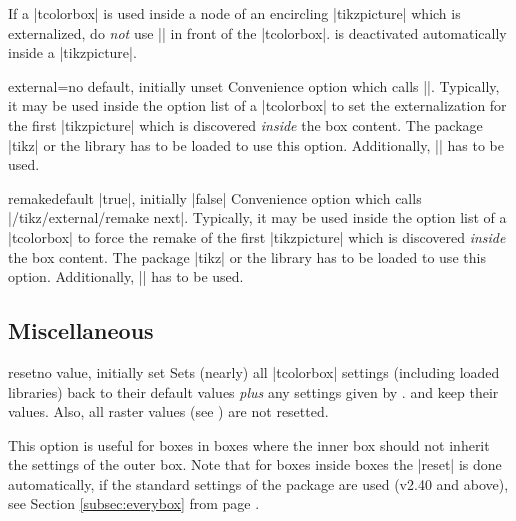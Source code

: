 \begin{marker}
If a |tcolorbox| is used inside a node of an encircling |tikzpicture| which is externalized,
do \emph{not} use |\tikzexternaldisable| in front of the |tcolorbox|.
 is deactivated automatically inside a |tikzpicture|.
\end{marker}

\begin{docTcbKey}{external}{=}{no default, initially unset}
  Convenience option which calls ||. Typically,
  it may be used inside the option list of a |tcolorbox| to set the
  externalization  for the first |tikzpicture| which is discovered
  \emph{inside} the box content.
  The package |tikz| \cite{tantau:2015a} or the library  has to be loaded to use this option.
  Additionally, |\usetikzlibrary{external}| has to be used.
\end{docTcbKey}

\begin{docTcbKey}{remake}{}{default |true|, initially |false|}
  Convenience option which calls |/tikz/external/remake next|. Typically,
  it may be used inside the option list of a |tcolorbox| to force the remake
  of the first |tikzpicture| which is discovered \emph{inside} the box content.
  The package |tikz| \cite{tantau:2015a} or the library  has to be loaded to use this option.
  Additionally, |\usetikzlibrary{external}| has to be used.
\end{docTcbKey}


\subsection{Miscellaneous}
\begin{docTcbKey}{reset}{}{no value, initially set}
Sets (nearly) all |tcolorbox| settings (including loaded libraries) back to their default values
\emph{plus} any settings given by .
 and  keep their values.
Also, all raster values (see ) are not resetted.

This option is useful for boxes in boxes where the inner box should not inherit
the settings of the outer box.
Note that for boxes inside boxes the |reset| is done automatically, if the
standard settings of the package are used (v2.40 and above), see
Section \ref{subsec:everybox} from page \pageref{subsec:everybox}.
\end{docTcbKey}

